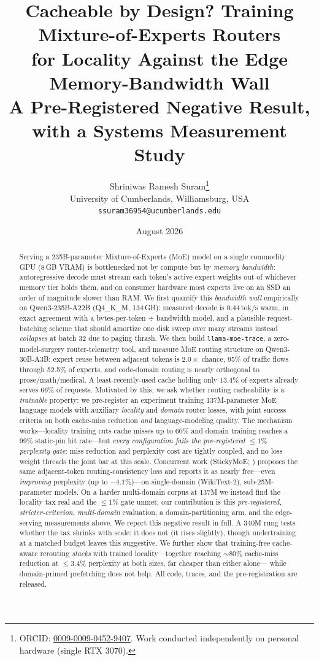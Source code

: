 \documentclass[11pt]{article}
\title{\textbf{Cacheable by Design? Training Mixture-of-Experts Routers\\
for Locality Against the Edge Memory-Bandwidth Wall}\\[4pt]
\large A Pre-Registered Negative Result, with a Systems Measurement Study}
\author{Shriniwas Ramesh Suram\thanks{ORCID: \href{https://orcid.org/0009-0009-0452-9407}{0009-0009-0452-9407}. Work conducted independently on personal hardware (single RTX 3070).}\\
University of Cumberlands, Williamsburg, USA\\
\texttt{ssuram36954@ucumberlands.edu}}
\date{August 2026}
\newcommand{\tps}{tok/s}
\newcommand{\num}[1]{\ensuremath{#1}}
\begin{document}
\maketitle

\begin{abstract}
Serving a 235B-parameter Mixture-of-Experts (MoE) model on a single commodity
GPU (8\,GB VRAM) is bottlenecked not by compute but by \emph{memory bandwidth}:
autoregressive decode must stream each token's active expert weights out of
whichever memory tier holds them, and on consumer hardware most experts live on
an SSD an order of magnitude slower than RAM. We first quantify this
\emph{bandwidth wall} empirically on Qwen3-235B-A22B (Q4\_K\_M, 134\,GB):
measured decode is \num{0.44}\,\tps{} warm, in exact agreement with a
bytes-per-token $\div$ bandwidth model, and a plausible request-batching scheme
that should amortize one disk sweep over many streams instead \emph{collapses}
at batch 32 due to paging thrash. We then build \texttt{llama-moe-trace}, a
zero-model-surgery router-telemetry tool, and measure MoE routing structure on
Qwen3-30B-A3B: expert reuse between adjacent tokens is $2.0\times$ chance, 95\%
of traffic flows through 52.5\% of experts, and code-domain routing is nearly
orthogonal to prose/math/medical. A least-recently-used cache holding only
13.4\% of experts already serves 66\% of requests. Motivated by this, we ask
whether routing cacheability is a \emph{trainable} property: we pre-register an
experiment training 137M-parameter MoE language models with auxiliary
\emph{locality} and \emph{domain} router losses, with joint success criteria on
both cache-miss reduction \emph{and} language-modeling quality. The mechanism
works---locality training cuts cache misses up to 60\% and domain training
reaches a 99\% static-pin hit rate---but \emph{every configuration fails the
pre-registered $\le\!1\%$ perplexity gate}: miss reduction and perplexity cost
are tightly coupled, and no loss weight threads the joint bar at this scale.
Concurrent work (StickyMoE; \citealp{kayyam2026sticky}) proposes the same
adjacent-token routing-consistency loss and reports it as nearly free---even
\emph{improving} perplexity (up to $-4.1\%$)---on single-domain (WikiText-2),
sub-25M-parameter models. On a harder multi-domain corpus at 137M we instead find
the locality tax real and the $\le\!1\%$ gate unmet; our contribution is this
\emph{pre-registered, stricter-criterion, multi-domain} evaluation, a
domain-partitioning arm, and the edge-serving measurements above. We
report this negative result in full. A 340M rung tests whether the tax shrinks with
scale: it does not (it rises slightly), though undertraining at a matched budget
leaves this suggestive. We further show that training-free cache-aware rerouting
\emph{stacks} with trained locality---together reaching $\sim$80\% cache-miss
reduction at $\le\!3.4\%$ perplexity at both sizes, far cheaper than either alone---
while domain-primed prefetching does not help. All code, traces, and the
pre-registration are released.
\end{abstract}
\end{document}
